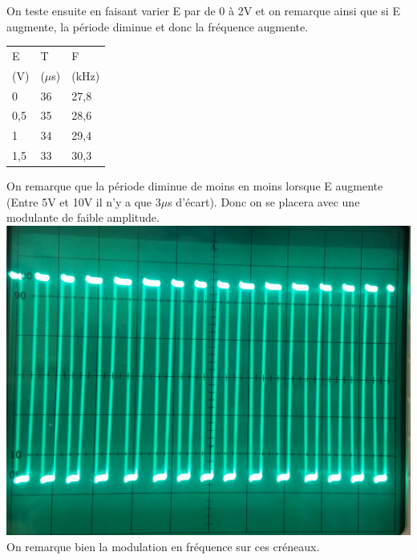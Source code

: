 \documentclass[12pt,a4paper]{article}
\begin{document}
On teste ensuite en faisant varier E par de 0 à 2V et on remarque ainsi que si E augmente, la période diminue et donc la fréquence augmente. \\
\begin{center}
\begin{tabular}{l|l|l}
E   & T    & F     \\
(V) & ($\mu$s) & (kHz) \\ \hline
0   & 36   & 27,8  \\
0,5 & 35   & 28,6  \\
1   & 34   & 29,4  \\
1,5 & 33   & 30,3 
\end{tabular}
\end{center}
On remarque que la période diminue de moins en moins lorsque E augmente (Entre 5V et 10V il n'y a que 3$\mu$s d'écart). Donc on se placera avec une modulante de faible amplitude.\\
\includegraphics[scale=0.1]{modfrecre}
\\
On remarque bien la modulation en fréquence sur ces créneaux.
\end{document}
